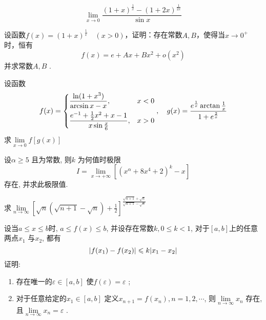 \begin{question}
    \begin{equation*}
        \lim_{x \to 0} \frac{ ( 1 + x )^{ \frac{1}{x} } -( 1 + 2x )^{ \frac{1}{2x} } }{ \sin x }
    \end{equation*}
\end{question}

\begin{question}
    设函数$ f(x) = (1 + x)^{\frac{1}{x}} \quad (x > 0) $，证明：存在常数$ A, B $，使得当$ x \to 0^+ $时，恒有
    \begin{equation*}
        f(x) = e + Ax +Bx^2 + o(x^2)
    \end{equation*}   
    并求常数$ A, B $ .
\end{question}

\begin{question}
    设函数
    \begin{equation*}
        f(x) = \begin{dcases}
            \frac{ \ln(1 + x^3) }{ \arcsin x - x }, & x < 0   \\
            \frac{ e^{-1} + \frac{1}{2} x^2 + x -1 }{ x \sin \frac{x}{6} }, & x > 0
        \end{dcases}, \quad g(x) = \frac{ e^{\frac{1}{x}} \arctan \frac{1}{x} }{ 1 + e^{\frac{2}{x}} }
    \end{equation*}
    求$ \lim\limits_{x \to 0} f [ g( x ) ] $ 
\end{question}

\begin{question}
    设$ \alpha \ge 5 $ 且为常数, 则$ k $ 为何值时极限
    \begin{equation*}
        I = \lim_{x \to + \infty} [( x^\alpha + 8x^4 +2 )^k - x]
    \end{equation*}
    存在, 并求此极限值.
\end{question}

\begin{question}
    求$ \lim\limits_{n \to \infty} [ \sqrt{n} ( \sqrt{ n + 1 } - \sqrt{n} ) + \frac{1}{2} ]^{\frac{ \sqrt{ n + 1 } + \sqrt{n} }{ \sqrt{ n + 1 } -\sqrt{n} }} $ 
\end{question}

\begin{question}
    设当$ a \le x \le b $时, $ a \le f(x) \le b $, 并设存在常数$ k, 0 \le k < 1 $, 对于$ [a, b] $上的任意两点$ x_1 $ 与$ x_2 $, 都有
    \begin{equation*}
        \lvert f(x_1) - f(x_2) \rvert \leqslant k \lvert x_1 - x_2 \rvert
    \end{equation*}
    证明:
    \begin{enumerate}
        \item 存在唯一的$ \varepsilon \in [a, b] $ 使$ f(\varepsilon) = \varepsilon $ ;
        \item 对于任意给定的$ x_1 \in [a, b] $ 定义$ x_{n + 1} = f(x_n), n = 1,2,\cdots $, 则$ \lim\limits_{n \to \infty} x_n $ 存在, 且$ \lim\limits_{n \to \infty} x_n = \varepsilon $ . 
    \end{enumerate}      
\end{question}